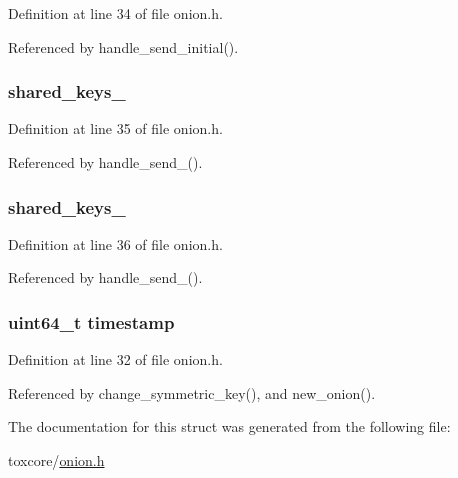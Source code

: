 Definition at line 34 of file onion.\+h.



Referenced by handle\+\_\+send\+\_\+initial().

\hypertarget{struct_onion_a01ec0631137b85dd55bf0cbb3492e8f5}{
\subsubsection[{shared\+\_\+keys\+\_\+2}]{ shared\+\_\+keys\+\_}}\label{struct_onion_a01ec0631137b85dd55bf0cbb3492e8f5}


Definition at line 35 of file onion.\+h.



Referenced by handle\+\_\+send\+\_().

\hypertarget{struct_onion_a2c2de8d3552fa4223cbf58557704b977}{
\subsubsection[{shared\+\_\+keys\+\_\+3}]{ shared\+\_\+keys\+\_}}\label{struct_onion_a2c2de8d3552fa4223cbf58557704b977}


Definition at line 36 of file onion.\+h.



Referenced by handle\+\_\+send\+\_().

\hypertarget{struct_onion_a465bef81f6478756e5443025b1f2ddfa}{
\subsubsection[{timestamp}]{\setlength{\rightskip}{0pt plus 5cm}uint64\+\_\+t timestamp}}\label{struct_onion_a465bef81f6478756e5443025b1f2ddfa}


Definition at line 32 of file onion.\+h.



Referenced by change\+\_\+symmetric\+\_\+key(), and new\+\_\+onion().



The documentation for this struct was generated from the following file\+:\begin{DoxyCompactItemize}
\item 
toxcore/\hyperlink{onion_8h}{onion.\+h}\end{DoxyCompactItemize}
